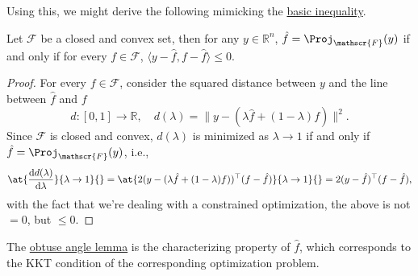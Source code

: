 Using this, we might derive the following mimicking the \hyperref[eq:basic-inequality]{basic inequality}.

\begin{lemma}\label{lma:obtuse-angle}
	Let \(\mathscr{F} \) be a closed and convex set, then for any \(y\in \mathbb{R} ^n\), \(\hat{f} = \Proj_{\mathscr{F} }(y) \) if and only if for every \(f\in \mathscr{F} \), \(\langle y - \hat{f} , f - \hat{f} \rangle \leq 0\).
	\begin{center}
	\end{center}
\end{lemma}
\begin{proof}
	For every \(f\in \mathscr{F} \), consider the squared distance between \(y\) and the line between \(\hat{f} \) and \(f\)
	\[
		d\colon [0, 1] \to \mathbb{R} ,\quad d(\lambda ) = \lVert y - (\lambda \hat{f} + (1 - \lambda )f ) \rVert ^2.
	\]
	Since \(\mathscr{F} \) is closed and convex, \(d(\lambda )\) is minimized as \(\lambda \to 1\) if and only if \(\hat{f} = \Proj_{\mathscr{F} } (y)\), i.e.,
	\[
		\at{\frac{\mathrm{d}d(\lambda )}{\mathrm{d}\lambda }}{\lambda \to 1}{}
		= \at{2 (y - ( \lambda \hat{f} + (1-\lambda ) f ) ) ^{\top} (f - \hat{f})}{\lambda \to 1}{}
		= 2 (y - \hat{f} ) ^{\top} (f - \hat{f}),
	\]
	with the fact that we're dealing with a constrained optimization, the above is not \(= 0\), but \(\leq 0\).
\end{proof}

\begin{remark}
	The \hyperref[lma:obtuse-angle]{obtuse angle lemma} is the characterizing property of \(\hat{f} \), which corresponds to the KKT condition of the corresponding optimization problem.
\end{remark}

